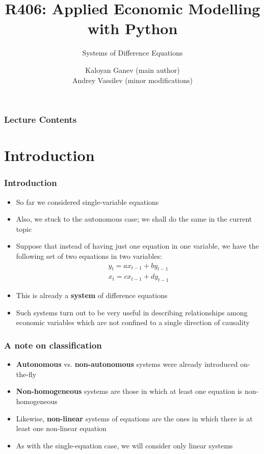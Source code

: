 \documentclass[10pt,usenames,dvipsnames]{beamer}
\title{R406: Applied Economic Modelling with Python}
\subtitle{\textcolor{myred}{Systems of Difference Equations}}
\author[Kaloyan Ganev,  Andrey Vassilev]{Kaloyan Ganev (main author) \\
	Andrey Vassilev (minor modifications)}
\date{}
\theoremstyle{plain}
\theoremstyle{definition}
\begin{document}
\maketitle

\begin{frame}[fragile]
\frametitle{Lecture Contents}
\tableofcontents
\end{frame}

\section{Introduction}
\begin{frame}[fragile]
\frametitle{Introduction}
\begin{itemize}
	\item So far we considered single-variable equations
	\item Also, we stuck to the autonomous case; we shall do the same in the current topic
	\item Suppose that instead of having just one equation in one variable, we have the following set of two equations in two variables:
	\[
		\begin{array}{lcl}
			y_{t} = ax_{t-1} + b y_{t-1}\\
			x_{t} = cx_{t-1} + d y_{t-1}
		\end{array}
	\]
	\item This is already a \textbf{system} of difference equations
	\item Such systems turn out to be very useful in describing relationships among economic variables which are not confined to a single direction of causality
\end{itemize}
\end{frame}

\begin{frame}[fragile]
\frametitle{A note on classification}
\begin{itemize}
	\item \textbf{Autonomous} vs. \textbf{non-autonomous} systems were already introduced on-the-fly
	\item \textbf{Non-homogeneous} systems are those in which at least one equation is non-homogeneous
	\item Likewise, \textbf{non-linear} systems of equations are the ones in which there is at least one non-linear equation
	\item As with the single-equation case, we will consider only linear systems
\end{itemize}
\end{frame}
\end{document}
